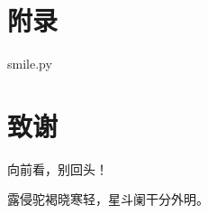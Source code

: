 


\chapter*{\sanhao\heiti\textbf{附\qquad 录}}

smile.py






\chapter*{\sanhao\heiti\textbf{致\qquad 谢}}

向前看，别回头！

露侵驼褐晓寒轻，星斗阑干分外明。